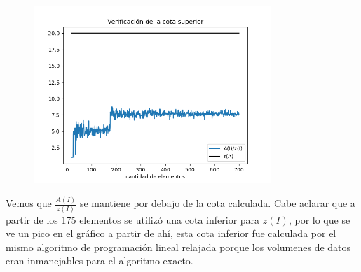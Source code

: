 \begin{figure}[H]
    \centering
    \includegraphics[width=0.8\textwidth]{img/cota.png}
\end{figure}

Vemos que $\frac{A(I)}{z(I)}$ se mantiene por debajo de la cota calculada. Cabe
aclarar que a partir de los 175 elementos se utilizó una cota inferior para
$z(I)$, por lo que se ve un pico en el gráfico a partir de ahí, esta cota
inferior fue calculada por el mismo algoritmo de programación lineal relajada
porque los volumenes de datos eran inmanejables para el algoritmo exacto.
